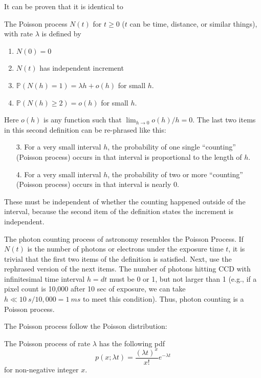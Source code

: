 It can be proven that it is identical to 

\begin{defn}
The Poisson process $ N(t) $ for $ t \ge 0 $ ($ t $ can be time, distance, or similar things), with rate $ \lambda $ is defined by
\begin{enumerate}
\item $ N(0) = 0 $
\item $ N(t) $ has independent increment
\item $ \mathbb{P}(N(h) = 1) = \lambda h + o(h) $ for small $ h $.
\item $ \mathbb{P}(N(h) \ge 2) = o(h) $ for small $ h $.
\end{enumerate}
\end{defn}

Here $ o(h) $ is any function such that $ \lim_{h \rightarrow 0} o(h) / h = 0 $. The last two items in this second definition can be re-phrased like this:
\begin{itemize}
\item [3.] For a very small interval $ h $, the probability of one single ``counting'' (Poisson process) occurs in that interval is proportional to the length of $ h $.
\item [4.] For a very small interval $ h $, the probability of two or more ``counting'' (Poisson process) occurs in that interval is nearly 0.
\end{itemize}
These must be independent of whether the counting happened outside of the interval, because the second item of the definition states the increment is independent.
\newpage
\begin{ex}
The photon counting process of astronomy resembles the Poisson Process. If $ N(t) $ is the number of photons or electrons under the exposure time $ t $, it is trivial that the first two items of the definition is satisfied. Next, use the rephrased version of the next items. The number of photons hitting CCD with infinitesimal time interval $ h = dt $ must be 0 or 1, but not larger than 1 (e.g., if a pixel count is 10,000 after 10 sec of exposure, we can take $ h \ll \SI{10}{s} / 10,000 = \SI{1}{ms} $ to meet this condition). Thus, photon counting is a Poisson process.
\end{ex}

The Poisson process follow the Poisson distribution:

\begin{defn} \label{def: Pois pdf}
The Poisson process of rate $ \lambda $ has the following pdf
\begin{equation} \label{eq: Pois pdf}
  p(x; \lambda t) = \frac{(\lambda t)^{x}}{x!} e^{-\lambda t}
\end{equation}
for non-negative integer $ x $.
\end{defn}

